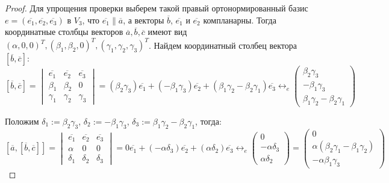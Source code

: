     \begin{proof}
    	Для упрощения проверки выберем такой правый ортонормированный базис $e = (\overline{e_1}, \overline{e_2}, \overline{e_3})$ в $V_3$, что $\overline{e_1} \parallel \overline{a}$, а векторы $\overline{b}$, $\overline{e_1}$ и $\overline{e_2}$ компланарны. Тогда координатные столбцы векторов $\overline{a}, \overline{b}, \overline{c}$ имеют вид $(\alpha, 0, 0)^T, (\beta_1, \beta_2, 0)^T, (\gamma_1, \gamma_2, \gamma_3)^T$. Найдем координатный столбец вектора $[\overline{b}, \overline{c}]$:
    	\[[\overline{b}, \overline{c}] =
    	\begin{vmatrix}
    		\overline{e_1} & \overline{e_2} & \overline{e_3}\\
    		\beta_1 & \beta_2 & 0\\
    		\gamma_1 & \gamma_2 & \gamma_3
    	\end{vmatrix} = (\beta_2\gamma_3)\overline{e_1} + (-\beta_1\gamma_3)\overline{e_2} + (\beta_1\gamma_2 - \beta_2\gamma_1)\overline{e_3} \leftrightarrow_{e}
    	\begin{pmatrix}
    		\beta_2\gamma_3\\-\beta_1\gamma_3\\\beta_1\gamma_2 - \beta_2\gamma_1
    	\end{pmatrix}\]
    	
    	Положим $\delta_1 := \beta_2\gamma_3$, $\delta_2 := -\beta_1\gamma_3$, $\delta_3 := \beta_1\gamma_2 - \beta_2\gamma_1$, тогда:
    	\[
    	[\overline{a}, [\overline{b}, \overline{c}]] =
    	\begin{vmatrix}
    	\overline{e_1} & \overline{e_2} & \overline{e_3}\\
    	\alpha & 0 & 0\\
    	\delta_1 & \delta_2 & \delta_3
    	\end{vmatrix} = 
    	0\overline{e_1} + (-\alpha\delta_3)\overline{e_2} + (\alpha\delta_2)\overline{e_3} \leftrightarrow_{e}
    	\begin{pmatrix}
    	0\\-\alpha\delta_3\\\alpha\delta_2
    	\end{pmatrix} = 
    	\begin{pmatrix}
    	0\\\alpha(\beta_2\gamma_1 - \beta_1\gamma_2)\\-\alpha\beta_1\gamma_3
    	\end{pmatrix}
    	\]
    	

\end{proof}
